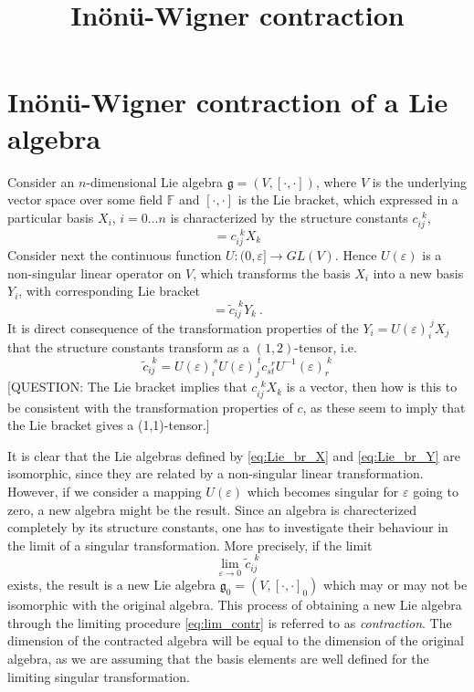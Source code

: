\documentclass[10pt]{article}
\title{In\"on\"u-Wigner contraction}
\author{}
\date{}
\newcommand{\mfrak}{\mathfrak}
\newcommand{\mbb}{\mathbb}
\newcommand{\spc}{\ }
\begin{document}
\maketitle

\section{In\"on\"u-Wigner contraction of a Lie algebra}

Consider an $n$-dimensional Lie algebra $\mfrak{g}=(V,[\cdot,\cdot])$, where $V$ 
is the underlying vector space over some field $\mbb{F}$ and $[\cdot,\cdot]$ is 
the Lie bracket, which expressed in a particular basis $X_i$, $i=0\dots n$ is 
characterized by the structure constants $c_{ij}^{\spc\spc k}$,
\begin{equation}
  [X_i,X_j]=c_{ij}^{\spc\spc k} X_k
  \label{eq:Lie_br_X}
\end{equation}
Consider next the continuous function $U:(0,\varepsilon]\rightarrow GL(V)$.  
Hence $U(\varepsilon)$ is a non-singular linear operator on $V$, which 
transforms the basis $X_i$ into a new basis $Y_i$, with corresponding Lie 
bracket
\begin{equation}
  [Y_i,Y_j]=\tilde{c}_{ij}^{~~k} Y_k ~.
  \label{eq:Lie_br_Y}
\end{equation}
It is direct consequence of the transformation properties of the $Y_i = 
U(\varepsilon)_i^{~j}X_j$ that the structure constants transform as a 
$(1,2)$-tensor, i.e.
\begin{equation}
  \tilde{c}_{ij}^{~~k} = U(\varepsilon)_{i}^{~s} U(\varepsilon)_{j}^{~t}
  c_{st}^{~~r} U^{-1}(\varepsilon)_{r}^{~k}
\end{equation}
[QUESTION: The Lie bracket implies that $c_{ij}^{~ ~k} X_k$ is a vector, then 
how is this to be consistent with the transformation properties of $c$, as these 
seem to imply that the Lie bracket gives a (1,1)-tensor.]

It is clear that the Lie algebras defined by \eqref{eq:Lie_br_X} and 
\eqref{eq:Lie_br_Y} are isomorphic, since they are related by a non-singular 
linear transformation. However, if we consider a mapping $U(\varepsilon)$ which 
becomes singular for $\varepsilon$ going to zero, a new algebra might be the 
result. Since an algebra is charecterized completely by its structure constants, 
one has to investigate their behaviour in the limit of a singular 
transformation. More precisely, if the limit
\begin{equation}
  \lim_{\varepsilon \rightarrow 0} \tilde{c}_{ij}^{~ ~k}
  \label{eq:lim_contr}
\end{equation}
exists, the result is a new Lie algebra $\mfrak{g}_0=(V,[\cdot,\cdot]_0)$ which 
may or may not be isomorphic with the original algebra. This process of 
obtaining a new Lie algebra through the limiting procedure \eqref{eq:lim_contr} 
is referred to as \emph{contraction}. The dimension of the contracted algebra 
will be equal to the dimension of the original algebra, as we are assuming that 
the basis elements are well defined for the limiting singular transformation.
\end{document}
